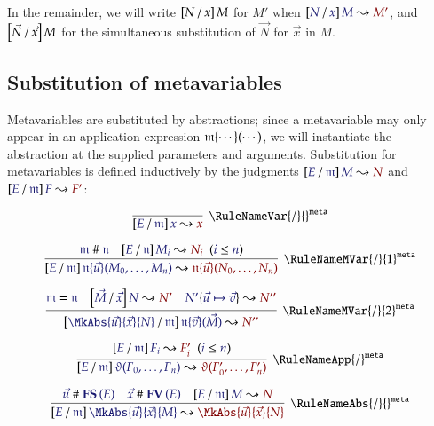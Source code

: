 In the remainder, we will write $\left[N\, /\, x\right]M$ for $M'$ when
$\IsSubst{N}{x}{M}{M'}$, and $\left[\vec{N}\, /\, \vec{x}\right]M$ for the simultaneous
substitution of $\vec{N}$ for $\vec{x}$ in $M$.

\subsection{Substitution of metavariables}

\newcommand\RuleMSubstPrefix{/}
\newcommand\RuleMSubstSuffix{\texttt{meta}}
\newcommand\RuleMSubstVar{\RuleNameVar{\RuleMSubstPrefix}{}^\RuleMSubstSuffix}
\newcommand\RuleMSubstMVar[1]{\RuleNameMVar{\RuleMSubstPrefix}{#1}^\RuleMSubstSuffix}
\newcommand\RuleMSubstApp{\RuleNameApp{\RuleMSubstPrefix}^\RuleMSubstSuffix}
\newcommand\RuleMSubstAbs{\RuleNameAbs{\RuleMSubstPrefix}{}^\RuleMSubstSuffix}


Metavariables are substituted by abstractions; since a metavariable may only
appear in an application expression $\mathfrak{m}\{\cdots\}(\cdots)$, we will
instantiate the abstraction at the supplied parameters and arguments.
Substitution for metavariables is defined inductively by the judgments
$\IsSubst{E}{\MV{m}}{M}{N}$ and $\IsSubst{E}{\MV{m}}{F}{F'}$:

\begin{gather*}
  \infer[\RuleMSubstVar]{
    \IsSubst{E}{\MV{m}}{x}{x}
  }{
  }
\\[6pt]
  \infer[\RuleMSubstMVar{1}]{
    \IsSubst{E}{\MV{m}}{
      \MApp{\MV{n}}{\vec{u}}{M_0,\dots,M_n}
    }{
      \MApp{\MV{n}}{\vec{u}}{N_0,\dots,N_n}
    }
  }{
    \IsApart{\MV{m}}{\MV{n}}
&
    \HypJ{
      \IsSubst{E}{\MV{n}}{M_i}{N_i}
    }{
      \Leq{i}{n}
    }
  }
\\[6pt]
  \infer[\RuleMSubstMVar{2}]{
    \IsSubst{
      \MkAbs{\vec{u}}{\vec{x}}{N}
    }{\MV{m}}{
      \MApp{\MV{n}}{\vec{v}}{\vec{M}}
    }{
      N''
    }
  }{
    \IsEq{\MV{m}}{\MV{n}}
&
    \IsSubst{\vec{M}}{\vec{x}}{N}{N'}
&
    \IsRenaming{\vec{u}\mapsto\vec{v}}{N'}{N''}
  }\\[6pt]
  \infer[\RuleMSubstApp]{
    \IsSubst{E}{\MV{m}}{
      \App{\vartheta}{F_0,\dots,F_n}
    }{
      \App{\vartheta}{F'_0,\dots,F'_n}
    }
  }{
    \HypJ{
      \IsSubst{E}{\MV{m}}{F_i}{F'_i}
    }{
      \Leq{i}{n}
    }
  }
\\[6pt]
  \infer[\RuleMSubstAbs]{
    \IsSubst{E}{\MV{m}}{
      \MkAbs{\vec{u}}{\vec{x}}{M}
    }{
      \MkAbs{\vec{u}}{\vec{x}}{N}
    }
  }{
    \IsApart{\vec{u}}{\FS{E}}
&
    \IsApart{\vec{x}}{\FV{E}}
&
    \IsSubst{E}{\MV{m}}{M}{N}
  }
\end{gather*}

